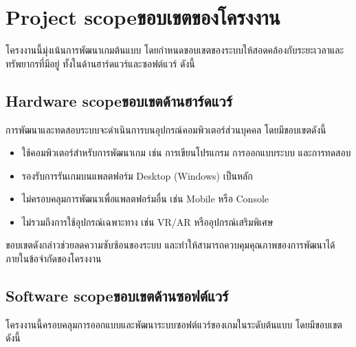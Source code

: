 \section{\ifenglish Project scope\else ขอบเขตของโครงงาน\fi}

    \hspace{1.5em}โครงงานนี้มุ่งเน้นการพัฒนาเกมต้นแบบ โดยกำหนดขอบเขตของระบบให้สอดคล้องกับระยะเวลาและ\\ทรัพยากรที่มีอยู่ ทั้งในด้านฮาร์ดแวร์และซอฟต์แวร์ ดังนี้

\subsection{\ifenglish Hardware scope\else ขอบเขตด้านฮาร์ดแวร์\fi}

    \hspace{1.5em}การพัฒนาและทดสอบระบบจะดำเนินการบนอุปกรณ์คอมพิวเตอร์ส่วนบุคคล โดยมีขอบเขตดังนี้

    \begin{itemize}
    \item ใช้คอมพิวเตอร์สำหรับการพัฒนาเกม เช่น การเขียนโปรแกรม การออกแบบระบบ และการทดสอบ
    \item รองรับการรันเกมบนแพลตฟอร์ม Desktop (Windows) เป็นหลัก
    \item ไม่ครอบคลุมการพัฒนาเพื่อแพลตฟอร์มอื่น เช่น Mobile หรือ Console
    \item ไม่รวมถึงการใช้อุปกรณ์เฉพาะทาง เช่น VR/AR หรืออุปกรณ์เสริมพิเศษ
    \end{itemize}

    ขอบเขตดังกล่าวช่วยลดความซับซ้อนของระบบ และทำให้สามารถควบคุมคุณภาพของการพัฒนาได้\\ภายในข้อจำกัดของโครงงาน

\subsection{\ifenglish Software scope\else ขอบเขตด้านซอฟต์แวร์\fi}

    \hspace{1.5em}โครงงานนี้ครอบคลุมการออกแบบและพัฒนาระบบซอฟต์แวร์ของเกมในระดับต้นแบบ โดยมีขอบเขต\\ดังนี้

